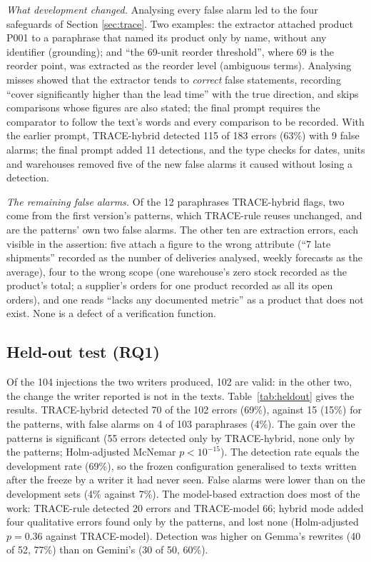 \documentclass[journal]{IEEEtran}
\renewcommand{\paragraph}[1]{\par\textit{#1}\enspace}
\begin{document}
\paragraph{What development changed.} Analysing every false alarm led to the four safeguards of Section
\ref{sec:trace}. Two examples: the extractor attached product P001 to a paraphrase that named its product
only by name, without any identifier (grounding); and ``the 69-unit reorder threshold'', where 69 is the
reorder point, was extracted as the reorder level (ambiguous terms). Analysing misses showed that the
extractor tends to \emph{correct} false statements, recording ``cover significantly higher than the lead
time'' with the true direction, and skips comparisons whose figures are also stated; the final prompt
requires the comparator to follow the text's words and every comparison to be recorded. With the earlier
prompt, TRACE-hybrid detected 115 of 183 errors (63\%) with 9 false alarms; the final prompt added 11
detections, and the type checks for dates, units and warehouses removed five of the new false alarms it
caused without losing a detection.

\paragraph{The remaining false alarms.} Of the 12 paraphrases TRACE-hybrid flags, two come from the
first version's patterns, which TRACE-rule reuses unchanged, and are the patterns' own two false alarms.
The other ten are extraction errors, each visible in the assertion: five attach a figure to the wrong
attribute (``7 late shipments'' recorded as the number of deliveries analysed, weekly forecasts as the
average), four to the wrong scope (one warehouse's zero stock recorded as the product's total; a supplier's
orders for one product recorded as all its open orders), and one reads ``lacks any documented metric'' as
a product that does not exist. None is a defect of a verification function.

\subsection{Held-out test (RQ1)}
Of the 104 injections the two writers produced, 102 are valid: in the other two, the change the writer
reported is not in the texts. Table~\ref{tab:heldout} gives the results. TRACE-hybrid detected 70 of the 102
errors (69\%), against 15 (15\%) for the patterns, with false alarms on 4 of 103 paraphrases (4\%). The gain
over the patterns is significant (55 errors detected only by TRACE-hybrid, none only by the patterns; Holm-adjusted
McNemar $p<10^{-15}$). The detection rate equals the development rate (69\%), so the frozen configuration
generalised to texts written after the freeze by a writer it had never seen. False alarms were lower than on
the development sets (4\% against 7\%). The model-based extraction does most of the work: TRACE-rule detected
20 errors and TRACE-model 66; hybrid mode added four qualitative errors found only by the patterns, and
lost none (Holm-adjusted $p=0.36$ against TRACE-model). Detection was
higher on Gemma's rewrites (40 of 52, 77\%) than on Gemini's (30 of 50, 60\%).
\end{document}
